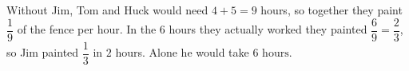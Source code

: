 Without Jim, Tom and Huck would need $4+5=9$ hours, so together they paint $\dfrac{1}{9}$ of the fence per hour. In the $6$ hours they actually worked they painted $\dfrac{6}{9}=\dfrac{2}{3}$, so Jim painted $\dfrac{1}{3}$ in $2$ hours. Alone he would take $\boxed{6\text{ hours}}$.
